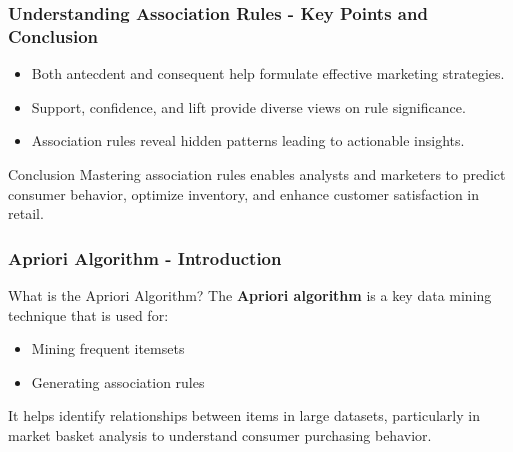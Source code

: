 \documentclass[aspectratio=169]{beamer}
\begin{document}
\begin{frame}[fragile]
    \frametitle{Understanding Association Rules - Key Points and Conclusion}
    \begin{itemize}
        \item Both antecdent and consequent help formulate effective marketing strategies.
        \item Support, confidence, and lift provide diverse views on rule significance.
        \item Association rules reveal hidden patterns leading to actionable insights.
    \end{itemize}
    \begin{block}{Conclusion}
        Mastering association rules enables analysts and marketers to predict consumer behavior, optimize inventory, and enhance customer satisfaction in retail.
    \end{block}
\end{frame}

\begin{frame}[fragile]
    \frametitle{Apriori Algorithm - Introduction}
    \begin{block}{What is the Apriori Algorithm?}
        The \textbf{Apriori algorithm} is a key data mining technique that is used for:
        \begin{itemize}
            \item Mining frequent itemsets
            \item Generating association rules
        \end{itemize}
        It helps identify relationships between items in large datasets, particularly in market basket analysis to understand consumer purchasing behavior.
    \end{block}
\end{frame}
\end{document}
